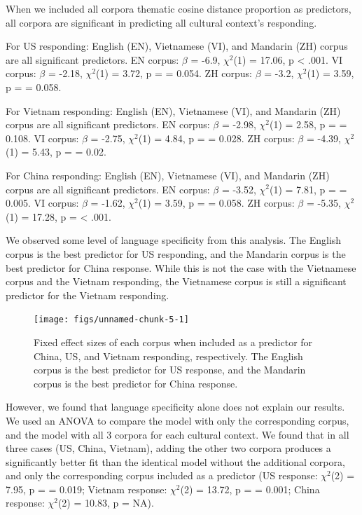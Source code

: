 \documentclass[10pt, letterpaper]{article}
\newenvironment{CodeChunk}{}{}
\begin{document}
When we included all corpora thematic cosine distance proportion as
predictors, all corpora are significant in predicting all cultural
context's responding.

For US responding: English (EN), Vietnamese (VI), and Mandarin (ZH)
corpus are all significant predictors. EN corpus: \(\beta\) = -6.9,
\(\chi^2\)(1) = 17.06, p \textless{} .001. VI corpus: \(\beta\) = -2.18,
\(\chi^2\)(1) = 3.72, p = = 0.054. ZH corpus: \(\beta\) = -3.2,
\(\chi^2\)(1) = 3.59, p = = 0.058.

For Vietnam responding: English (EN), Vietnamese (VI), and Mandarin (ZH)
corpus are all significant predictors. EN corpus: \(\beta\) = -2.98,
\(\chi^2\)(1) = 2.58, p = = 0.108. VI corpus: \(\beta\) = -2.75,
\(\chi^2\)(1) = 4.84, p = = 0.028. ZH corpus: \(\beta\) = -4.39,
\(\chi^2\)(1) = 5.43, p = = 0.02.

For China responding: English (EN), Vietnamese (VI), and Mandarin (ZH)
corpus are all significant predictors. EN corpus: \(\beta\) = -3.52,
\(\chi^2\)(1) = 7.81, p = = 0.005. VI corpus: \(\beta\) = -1.62,
\(\chi^2\)(1) = 3.59, p = = 0.058. ZH corpus: \(\beta\) = -5.35,
\(\chi^2\)(1) = 17.28, p = \textless{} .001.

We observed some level of language specificity from this analysis. The
English corpus is the best predictor for US responding, and the Mandarin
corpus is the best predictor for China response. While this is not the
case with the Vietnamese corpus and the Vietnam responding, the
Vietnamese corpus is still a significant predictor for the Vietnam
responding.

\begin{CodeChunk}
\begin{figure}[tb]
\texttt{[image: figs/unnamed-chunk-5-1]} \caption[Fixed effect sizes of each corpus when included as a predictor for China, US, and Vietnam responding, respectively]{Fixed effect sizes of each corpus when included as a predictor for China, US, and Vietnam responding, respectively. The English corpus is the best predictor for US response, and the Mandarin corpus is the best predictor for China response.}\label{fig:unnamed-chunk-5}
\end{figure}
\end{CodeChunk}

However, we found that language specificity alone does not explain our
results. We used an ANOVA to compare the model with only the
corresponding corpus, and the model with all 3 corpora for each cultural
context. We found that in all three cases (US, China, Vietnam), adding
the other two corpora produces a significantly better fit than the
identical model without the additional corpora, and only the
corresponding corpus included as a predictor (US response: \(\chi^2\)(2)
= 7.95, p = = 0.019; Vietnam response: \(\chi^2\)(2) = 13.72, p = =
0.001; China response: \(\chi^2\)(2) = 10.83, p = NA).
\end{document}

